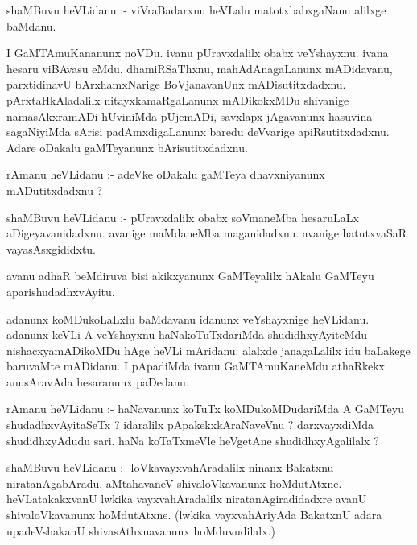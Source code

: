 \documentclass{article}
\begin{document}
\begin{mn}
shaMBuvu  heVLidanu :- viVraBadarxnu  heVLalu  matotxbabxgaNanu  alilxge  baMdanu.
\end{mn}

\begin{mn}
I  GaMTAmuKananunx  noVDu.  ivanu  pUravxdalilx  obabx  veYshayxnu.  ivana  hesaru  viBAvasu  eMdu.  dhamiRSaThxnu,  mahAdAnagaLanunx  
mADidavanu,  parxtidinavU  bArxhamxNarige  BoVjanavanUnx  mADisutitxdadxnu.  pArxtaHkAladalilx  nitayxkamaRgaLanunx  mADikokxMDu  shivanige  
namasAkxramADi  hUviniMda  pUjemADi,  savxlapx  jAgavanunx  hasuvina  sagaNiyiMda  sArisi  padAmxdigaLanunx  baredu  deVvarige  apiRsutitxdadxnu.  
Adare  oDakalu  gaMTeyanunx  bArisutitxdadxnu.
\end{mn}

\begin{mn}
rAmanu  heVLidanu :- adeVke  oDakalu  gaMTeya  dhavxniyanunx  mADutitxdadxnu ?
\end{mn}

\begin{mn}
shaMBuvu  heVLidanu :- pUravxdalilx  obabx  soVmaneMba  hesaruLaLx  aDigeyavanidadxnu.  avanige  maMdaneMba  maganidadxnu.  avanige  
hatutxvaSaR  vayasAsxgididxtu.
\end{mn}

\begin{mn}
avanu  adhaR  beMdiruva  bisi  akikxyanunx  GaMTeyalilx  hAkalu  GaMTeyu  aparishudadhxvAyitu.
\end{mn}

\begin{mn}
adanunx  koMDukoLaLxlu  baMdavanu  idanunx  veYshayxnige  heVLidanu.  adanunx  keVLi  A  veYshayxnu  haNakoTuTxdariMda  shudidhxyAyiteMdu  
nishacxyamADikoMDu  hAge  heVLi  mAridanu.  alalxde  janagaLalilx  idu  baLakege  baruvaMte  mADidanu.  I  pApadiMda  ivanu  GaMTAmuKaneMdu  
athaRkekx  anusAravAda  hesaranunx  paDedanu.
\end{mn}

\begin{mn}
rAmanu  heVLidanu :- haNavanunx  koTuTx  koMDukoMDudariMda  A  GaMTeyu  shudadhxvAyitaSeTx ?  idaralilx  pApakekxkAraNaveVnu ?  
darxvayxdiMda  shudidhxyAdudu  sari.  haNa  koTaTxmeVle  heVgetAne  shudidhxyAgalilalx ?
\end{mn}

\begin{mn}
shaMBuvu  heVLidanu :- loVkavayxvahAradalilx  ninanx  Bakatxnu  niratanAgabAradu.  aMtahavaneV  shivaloVkavanunx  hoMdutAtxne.  
heVLatakakxvanU  lwkika  vayxvahAradalilx  niratanAgiradidadxre  avanU  shivaloVkavanunx  hoMdutAtxne. (lwkika  vayxvahAriyAda  
BakatxnU  adara  upadeVshakanU  shivasAthxnavanunx  hoMduvudilalx.) 
\end{mn}
\end{document}
